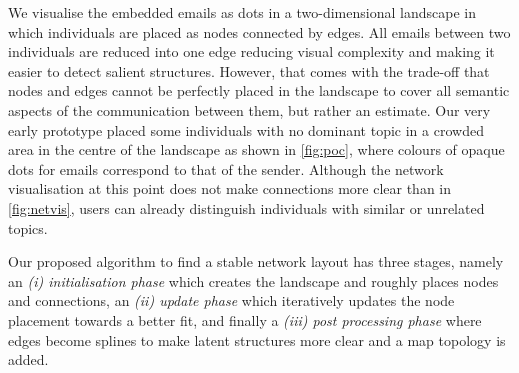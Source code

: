 We visualise the embedded emails as dots in a two-dimensional landscape in which individuals are placed as nodes connected by edges.
All emails between two individuals are reduced into one edge reducing visual complexity and making it easier to detect salient structures.
However, that comes with the trade-off that nodes and edges cannot be perfectly placed in the landscape to cover all semantic aspects of the communication between them, but rather an estimate.
Our very early prototype placed some individuals with no dominant topic in a crowded area in the centre of the landscape as shown in \ref{fig:poc}, where colours of opaque dots for emails correspond to that of the sender.
Although the network visualisation at this point does not make connections more clear than in \ref{fig:netvis}, users can already distinguish individuals with similar or unrelated topics.

Our proposed algorithm to find a stable network layout has three stages, namely an \textit{(i) initialisation phase} which creates the landscape and roughly places nodes and connections, an \textit{(ii) update phase} which iteratively updates the node placement towards a better fit, and finally a \textit{(iii) post processing phase} where edges become splines to make latent structures more clear and a map topology is added.






